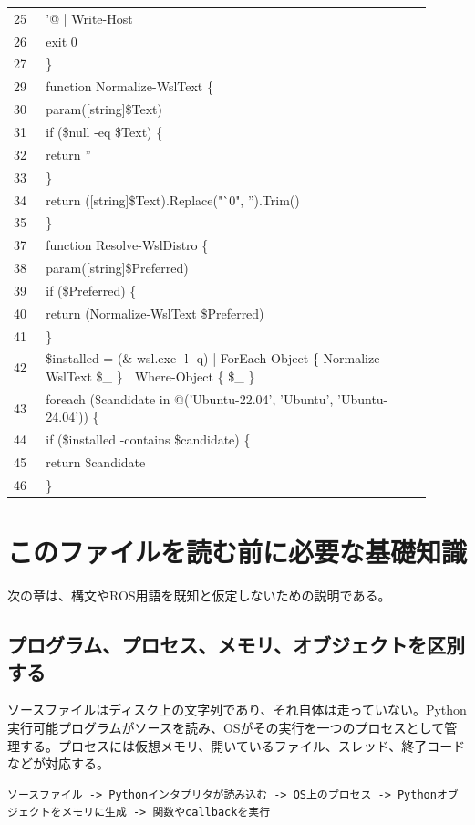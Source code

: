 \documentclass[a4paper,11pt]{article}
\begin{document}
\begin{longtable}{p{0.07\linewidth} p{0.84\linewidth}}
25 & '@ | Write-Host \\
26 & exit 0 \\
27 & \} \\
29 & function Normalize-WslText \{ \\
30 & param([string]\$Text) \\
31 & if (\$null -eq \$Text) \{ \\
32 & return '' \\
33 & \} \\
34 & return ([string]\$Text).Replace("`0", '').Trim() \\
35 & \} \\
37 & function Resolve-WslDistro \{ \\
38 & param([string]\$Preferred) \\
39 & if (\$Preferred) \{ \\
40 & return (Normalize-WslText \$Preferred) \\
41 & \} \\
42 & \$installed = (\& wsl.exe -l -q) | ForEach-Object \{ Normalize-WslText \$\_ \} | Where-Object \{ \$\_ \} \\
43 & foreach (\$candidate in @('Ubuntu-22.04', 'Ubuntu', 'Ubuntu-24.04')) \{ \\
44 & if (\$installed -contains \$candidate) \{ \\
45 & return \$candidate \\
46 & \} \\
            \bottomrule
            \end{longtable}



        \section{このファイルを読む前に必要な基礎知識}
        次の章は、構文やROS用語を既知と仮定しないための説明である。

        \subsection{プログラム、プロセス、メモリ、オブジェクトを区別する}
ソースファイルはディスク上の文字列であり、それ自体は走っていない。Python実行可能プログラムがソースを読み、OSがその実行を一つのプロセスとして管理する。プロセスには仮想メモリ、開いているファイル、スレッド、終了コードなどが対応する。


\begin{lstlisting}
ソースファイル -> Pythonインタプリタが読み込む -> OS上のプロセス -> Pythonオブジェクトをメモリに生成 -> 関数やcallbackを実行
\end{lstlisting}
\end{document}
